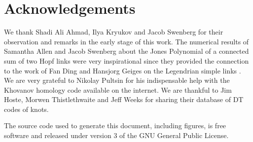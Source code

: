 \documentclass{article}
\theoremstyle{plain}
\begin{document}
    \section{Acknowledgements}
        We thank Shadi Ali Ahmad, Ilya Kryukov and Jacob Swenberg for their
        observation and remarks in the early stage of this work. The numerical
        results of Samantha Allen and Jacob Swenberg about the Jones Polynomial
        of a connected sum of two Hopf links were very inspirational since they
        provided the connection to the work of Fan Ding and Hansjorg Geiges on
        the Legendrian simple links . We are very grateful to Nikolay Pultsin
        for his indispensable help with the Khovanov homology code available
        on the internet. We are thankful to Jim Hoste, Morwen Thistlethwaite
        and Jeff Weeks for sharing their database of DT codes of knots.
    \newpage
    
    
    \newpage
    The source code used to generate this document, including figures,
    is free software and released under version 3 of the GNU General Public
    License.
\end{document}
